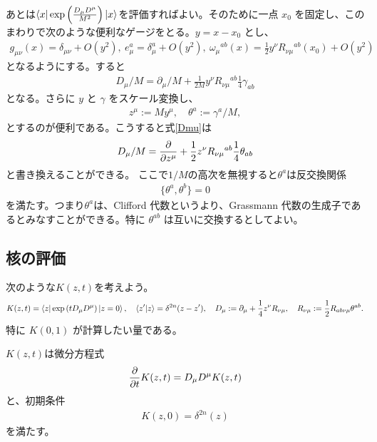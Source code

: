 \documentclass[12pt,a4paper]{jlreq}
\newcommand{\del}{\partial}
\begin{document}
あとは$\bra{x}\exp\left(\frac{D_{\mu}D^{\mu}}{M^2}\right)\ket{x}$を評価すればよい。そのために一点 $x_0$ を固定し、このまわりで次のような便利なゲージをとる。$y=x-x_0$ とし、
\begin{align}
  g_{\mu\nu}(x)=\delta_{\mu\nu}+O(y^2),\
  e^{a}_{\mu}=\delta^{a}_{\mu}+O(y^2),\
  \omega_{\mu}{}^{ab}(x)=\frac12 y^{\nu}R_{\nu\mu}{}^{ab}(x_0)+O(y^2)
\end{align}
となるようにする。すると
\begin{align}
  D_{\mu}/M=\del_{\mu}/M+\frac1{2M} y^{\nu}R_{\nu\mu}{}^{ab}\frac14 \gamma_{ab}\label{Dmu}
\end{align}
となる。さらに $y$ と $\gamma$ をスケール変換し、
\begin{align}
  z^{\mu}:=M y^{\mu},\quad \theta^{a}:=\gamma^{a}/M,
\end{align}
とするのが便利である。こうすると式\eqref{Dmu}は
\begin{align}
  D_{\mu}/M=\pdv{z^{\mu}}+\frac1{2} z^{\nu}R_{\nu\mu}{}^{ab}\frac14 \theta_{ab}
\end{align}
と書き換えることができる。
ここで$1/M$の高次を無視すると$\theta^a$は反交換関係
\begin{align}
  \{\theta^a,\theta^b\}=0
\end{align}
を満たす。つまり$\theta^a$は、Clifford 代数というより、Grassmann 代数の生成子であるとみなすことができる。特に $\theta^{ab}$ は互いに交換するとしてよい。

\subsection*{核の評価}
次のような$K(z,t)$を考えよう。
\begin{align}
  K(z,t)=\bra{z}\exp\qty(tD_{\mu}D^{\mu})\ket{z=0},\quad
  \ip{z'}{z}=\delta^{2n}(z-z'),\quad
  D_{\mu}:=\del_{\mu}+\frac14 z^{\nu}R_{\nu\mu},\quad
  R_{\nu\mu}:=\frac12 R_{ab\nu\mu}\theta^{ab}.
\end{align}
特に $K(0,1)$ が計算したい量である。

$K(z,t)$は微分方程式
\begin{align}
  \pdv{t} K(z,t)=D_{\mu}D^{\mu} K(z,t)
  \label{diffeq}
\end{align}
と、初期条件
\begin{align}
  K(z,0)=\delta^{2n}(z)\label{initial}
\end{align}
を満たす。
\end{document}
